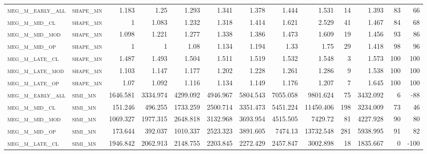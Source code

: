 \begin{landscape}
\begin{center}
\begin{footnotesize}
\begin{longtable}{llrrrrrrrr|rrr}
\textsc{meg\_m\_early\_all} & \textsc{shape\_mn }   & 1.183    & 1.25     & 1.293    & 1.341    & 1.378    & 1.444    & 1.531     & 14     & 1.393         & 83            & 66              \\
\textsc{meg\_m\_mid\_cl   } & \textsc{shape\_mn }   & 1        & 1.083    & 1.232    & 1.318    & 1.414    & 1.621    & 2.529     & 41     & 1.467         & 84            & 68              \\
\textsc{meg\_m\_mid\_mod  } & \textsc{shape\_mn }   & 1.098    & 1.221    & 1.277    & 1.338    & 1.386    & 1.473    & 1.609     & 19     & 1.456         & 93            & 86              \\
\textsc{meg\_m\_mid\_op   } & \textsc{shape\_mn }   & 1        & 1        & 1.08     & 1.134    & 1.194    & 1.33     & 1.75      & 29     & 1.418         & 98            & 96              \\
\textsc{meg\_m\_late\_cl  } & \textsc{shape\_mn }   & 1.487    & 1.493    & 1.504    & 1.511    & 1.519    & 1.532    & 1.548     & 3      & 1.573         & 100           & 100             \\
\textsc{meg\_m\_late\_mod } & \textsc{shape\_mn }   & 1.103    & 1.147    & 1.177    & 1.202    & 1.228    & 1.261    & 1.286     & 9      & 1.538         & 100           & 100             \\
\textsc{meg\_m\_late\_op  } & \textsc{shape\_mn }   & 1.07     & 1.092    & 1.116    & 1.134    & 1.149    & 1.176    & 1.207     & 7      & 1.645         & 100           & 100             \\
\textsc{meg\_m\_early\_all} & \textsc{simi\_mn  }   & 1646.581 & 3334.974 & 4299.092 & 4946.967 & 5804.543 & 7055.058 & 9801.624  & 75     & 3432.092      & 6             & -88             \\
\textsc{meg\_m\_mid\_cl   } & \textsc{simi\_mn  }   & 151.246  & 496.255  & 1733.259 & 2500.714 & 3351.473 & 5451.224 & 11450.406 & 198    & 3234.009      & 73            & 46              \\
\textsc{meg\_m\_mid\_mod  } & \textsc{simi\_mn  }   & 1069.327 & 1977.315 & 2648.818 & 3132.968 & 3693.954 & 4515.505 & 7429.72   & 81     & 4227.928      & 90            & 80              \\
\textsc{meg\_m\_mid\_op   } & \textsc{simi\_mn  }   & 173.644  & 392.037  & 1010.337 & 2523.323 & 3891.605 & 7474.13  & 13732.548 & 281    & 5938.995      & 91            & 82              \\
\textsc{meg\_m\_late\_cl  } & \textsc{simi\_mn  }   & 1946.842 & 2062.913 & 2148.755 & 2203.845 & 2272.429 & 2457.847 & 3002.898  & 18     & 1835.667      & 0             & -100            \\

\end{longtable}
\end{footnotesize}
\end{center}
\end{landscape}
